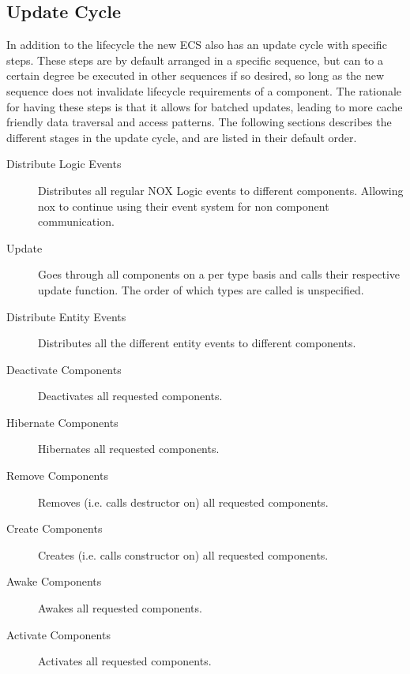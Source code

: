 \subsection{Update Cycle}
In addition to the lifecycle the new ECS also has an update cycle with specific steps.
These steps are by default arranged in a specific sequence, but can to a certain degree
be executed in other sequences if so desired,
so long as the new sequence does not invalidate lifecycle requirements of a component.
The rationale for having these steps is that it allows for batched updates,
leading to more cache friendly data traversal and access patterns.
The following sections describes the different stages in the update cycle,
and are listed in their default order.

\begin{description}
    \item
    [Distribute Logic Events]
    Distributes all regular NOX Logic events to different components.
    Allowing nox to continue using their event system for non component communication.

    \item
    [Update]
    Goes through all components on a per type basis and calls their respective update function.
    The order of which types are called is unspecified.

    \item
    [Distribute Entity Events]
    Distributes all the different entity events to different components.

    \item
    [Deactivate Components]
    Deactivates all requested components.

    \item
    [Hibernate Components]
    Hibernates all requested components.

    \item
    [Remove Components]
    Removes (i.e. calls destructor on) all requested components.

    \item
    [Create Components]
    Creates (i.e. calls constructor on) all requested components.

    \item
    [Awake Components]
    Awakes all requested components.

    \item
    [Activate Components]
    Activates all requested components.
\end{description}
